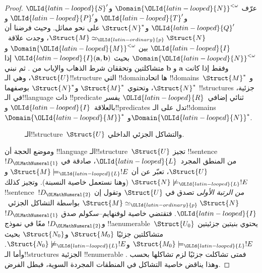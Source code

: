 \documentclass[../../../include/open-logic-section]{subfiles}
\begin{document}
\begin{proof}
عرّف $\Domain{{\OLId{latin-looped}{N}}}^{<\omega}$ و${\OLId{latin-looped}{S}}'$ و${\OLId{latin-looped}{T}}'$ و${\OLId{latin-looped}{P}}'$ و${\OLId{latin-looped}{Q}}'$ و$\Struct{N}^*$
على نحو مماثل. وحيث فرضنا أن $\Struct{M} \simeq_{\OLId{latin-ordinary}{p}} \Struct{N}$، وجدت
علاقة~${\OLId{latin-looped}{I}}$ بين $\Domain{{\OLId{latin-looped}{M}}}^{<\omega}$ و$\Domain{{\OLId{latin-looped}{N}}}^{<\omega}$ بحيث
${\OLId{latin-looped}{I}}(\mathbf{a},\mathbf{b})$ إذا وفقط إذا كانت $\mathbf{a}$ و
$\mathbf{b}$ متشاكلتين وتحققان شرط الذهاب والإياب من
. ثم نبني $\Struct{U}$، وهي
الـ!!{structure} التي !!{domain}ها اتحاد !!{domain}s~$\Struct{M}^*$
و$\Struct{N}^*$، وتحتوي $\Struct{M}^*$ و$\Struct{N}^*$ بوصفهما
!!{structure}s جزئية، في الـ!!{language} ذات !!{predicate} ثنائي
إضافي~${\OLId{latin-looped}{R}}$ يفسر بالعلاقة~${\OLId{latin-looped}{I}}$ و!!{predicate}s تدل على الـ!!{domain}s
$\Domain{{\OLId{latin-looped}{M}}}^*$ و$\Domain{{\OLId{latin-looped}{N}}}^*$.

\begin{figure}[h]
  \centering
  \caption{الـ!!{structure}~$\Struct{U}$ والتشاكل الجزئي الداخلي.}
\end{figure}

وموضع الحجة أن !!{language} الـ!!{structure}~$\Struct{U}$
تجيز !!{sentence}~$!D_{\OLMathNumeral{1}}$ من المنطق المجرد~${\OLId{latin-looped}{L}}$، صادقة في $\Struct{U}$، تعبّر عن أن
$\Struct{M} \models_{\OLId{latin-looped}{L}} !E$ و$\Struct{N} \not\models_{\OLId{latin-looped}{L}} !E$ (وهنا نستعمل
خاصية النسبنة). وتجيز كذلك !!{sentence}~$!D_{\OLMathNumeral{2}}$ \emph{من الرتبة الأولى}
تصدق في $\Struct{U}$ وتقول إن $\Struct{M} \simeq_{\OLId{latin-ordinary}{p}} \Struct{N}$ بواسطة
التشاكل الجزئي~${\OLId{latin-looped}{I}}$. فتقتضي خاصية لوفنهايم--سكولم صدق $!D_{\OLMathNumeral{1}}$ و$!D_{\OLMathNumeral{2}}$ معًا
في نموذج !!a{enumerable}~$\Struct{U_0}$ يحتوي بنيتين جزئيتين متشاكلتين
جزئيًا $\Struct{M_0}$ و$\Struct{N_0}$ بحيث
$\Struct{M_0} \models_{\OLId{latin-looped}{L}} !E$ و$\Struct{N_0} \not\models_{\OLId{latin-looped}{L}} !E$. وأما
الـ!!{structure}s الجزئية !!{enumerable} فمتى تشاكلت جزئيًا لزم تشاكلها
بحسب . وهذا يناقض خاصية التشاكل في المنطقات
المجردة السوية، فبطل الفرض.
\end{proof}
\end{document}
